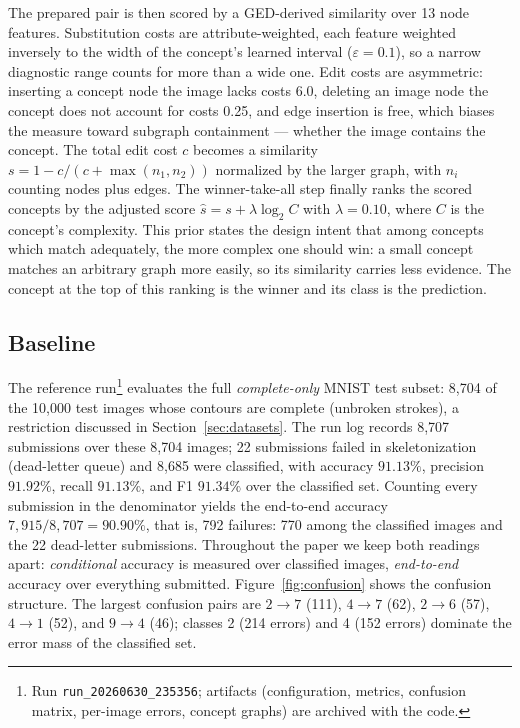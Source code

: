 \documentclass[conference]{IEEEtran}
\begin{document}
The prepared pair is then scored by a GED-derived similarity over 13 node
features. Substitution costs are attribute-weighted, each feature weighted
inversely to the width of the concept's learned interval
($\varepsilon = 0.1$), so a narrow diagnostic range counts for more than a
wide one. Edit costs are asymmetric: inserting a concept node the image
lacks costs 6.0, deleting an image node the concept does not account for
costs 0.25, and edge insertion is free, which biases the measure toward
subgraph containment --- whether the image contains the concept. The total
edit cost $c$ becomes a similarity $s = 1 - c/(c + \max(n_1, n_2))$
normalized by the larger graph, with $n_i$ counting nodes plus edges. The
winner-take-all step finally ranks the scored concepts by the adjusted score
$\hat{s} = s + \lambda \log_2 C$ with $\lambda = 0.10$, where $C$ is the
concept's complexity. This prior states the design intent that among
concepts which match adequately, the more complex one should win: a small
concept matches an arbitrary graph more easily, so its similarity carries
less evidence. The concept at the top of this ranking is the winner and its
class is the prediction.

\subsection{Baseline}
\label{sec:baseline}

The reference run\footnote{Run \texttt{run\_20260630\_235356}; artifacts
(configuration, metrics, confusion matrix, per-image errors, concept
graphs) are archived with the code.} evaluates the full \emph{complete-only}
MNIST test subset: 8{,}704 of the 10{,}000 test images whose contours are
complete (unbroken strokes), a restriction discussed in
Section~\ref{sec:datasets}. The run log records 8{,}707 submissions over
these 8{,}704 images; 22 submissions failed in
skeletonization (dead-letter queue) and 8{,}685 were classified, with
accuracy $91.13\%$, precision $91.92\%$, recall $91.13\%$, and F1
$91.34\%$ over the classified set. Counting every submission in the
denominator yields the end-to-end accuracy $7{,}915/8{,}707 = 90.90\%$,
that is, 792 failures: 770 among the classified images and the 22
dead-letter submissions.
Throughout the paper we keep both readings apart: \emph{conditional}
accuracy is measured over classified images, \emph{end-to-end} accuracy
over everything submitted.
Figure~\ref{fig:confusion} shows the confusion structure. The largest
confusion pairs are $2{\to}7$ (111), $4{\to}7$ (62), $2{\to}6$ (57),
$4{\to}1$ (52), and $9{\to}4$ (46); classes 2 (214 errors) and 4 (152
errors) dominate the error mass of the classified set.
\end{document}
